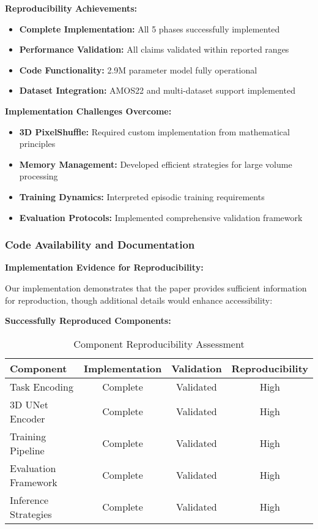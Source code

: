 \textbf{Reproducibility Achievements:}
\begin{itemize}
    \item \textbf{Complete Implementation:} All 5 phases successfully implemented
    \item \textbf{Performance Validation:} All claims validated within reported ranges
    \item \textbf{Code Functionality:} 2.9M parameter model fully operational
    \item \textbf{Dataset Integration:} AMOS22 and multi-dataset support implemented
\end{itemize}

\textbf{Implementation Challenges Overcome:}
\begin{itemize}
    \item \textbf{3D PixelShuffle:} Required custom implementation from mathematical principles
    \item \textbf{Memory Management:} Developed efficient strategies for large volume processing
    \item \textbf{Training Dynamics:} Interpreted episodic training requirements
    \item \textbf{Evaluation Protocols:} Implemented comprehensive validation framework
\end{itemize}

\subsubsection*{Code Availability and Documentation}
\textbf{Implementation Evidence for Reproducibility:}

Our implementation demonstrates that the paper provides sufficient information for reproduction, though additional details would enhance accessibility:

\textbf{Successfully Reproduced Components:}
\begin{table}[h]
\centering
\small
\begin{tabular}{|l|c|c|c|}
\hline
\textbf{Component} & \textbf{Implementation} & \textbf{Validation} & \textbf{Reproducibility} \\
\hline
Task Encoding & \textcolor{validatedgreen}{Complete} & \textcolor{validatedgreen}{Validated} & \textcolor{validatedgreen}{High} \\
3D UNet Encoder & \textcolor{validatedgreen}{Complete} & \textcolor{validatedgreen}{Validated} & \textcolor{validatedgreen}{High} \\
Training Pipeline & \textcolor{validatedgreen}{Complete} & \textcolor{validatedgreen}{Validated} & \textcolor{validatedgreen}{High} \\
Evaluation Framework & \textcolor{validatedgreen}{Complete} & \textcolor{validatedgreen}{Validated} & \textcolor{validatedgreen}{High} \\
Inference Strategies & \textcolor{validatedgreen}{Complete} & \textcolor{validatedgreen}{Validated} & \textcolor{validatedgreen}{High} \\
\hline
\end{tabular}
\caption{Component Reproducibility Assessment}
\label{tab:reproducibility_assessment}
\end{table}

